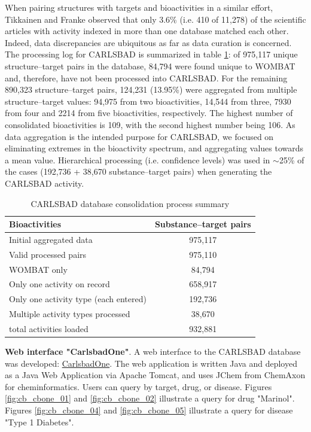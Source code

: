 When pairing structures with targets and bioactivities in a similar effort, Tikkainen and Franke observed that only 3.6\% (i.e. 410 of 11,278) of the scientific articles with activity indexed in more than one database matched each other. Indeed, data discrepancies are ubiquitous as far as data curation is concerned\cite{Tiikkainen2012-cw}. The processing log for CARLSBAD is summarized in table \ref{tab:cb_01}: of 975,117 unique structure–target pairs in the database, 84,794 were found unique to WOMBAT and, therefore, have not been processed into CARLSBAD. For the remaining 890,323 structure–target pairs, 124,231 (13.95\%) were aggregated from multiple structure–target values: 94,975 from two bioactivities, 14,544 from three, 7930 from four and 2214 from five bioactivities, respectively. The highest number of consolidated bioactivities is 109, with the second highest number being 106. As data aggregation is the intended purpose for CARLSBAD, we focused on eliminating extremes in the bioactivity spectrum, and aggregating values towards a mean value. Hierarchical processing (i.e. confidence levels) was used in $\sim$25\% of the cases (192,736 + 38,670 substance–target pairs) when generating the CARLSBAD activity.

\begin{table}
\caption{CARLSBAD database consolidation process summary}
\label{tab:cb_01}
\centering
\begin{tabular}{l|c}
\hline
\textbf{Bioactivities} & \textbf{Substance–target pairs} \\
\hline
Initial aggregated data & 975,117\\
Valid processed pairs & 975,110\\
WOMBAT only & 84,794\\
Only one activity on record & 658,917\\
Only one activity type (each entered) & 192,736\\ 
Multiple activity types processed & 38,670\\
total activities loaded & 932,881\\
\hline
\end{tabular}
\end{table}


\textbf{Web interface "CarlsbadOne"}. A web interface to the CARLSBAD database was developed:  \href{https://datascience.unm.edu/tomcat/carlsbad/carlsbadone}{CarlsbadOne}. The web application is written Java and deployed as a Java Web Application via Apache Tomcat, and uses JChem from ChemAxon for cheminformatics. Users can query by target, drug, or disease. Figures \ref{fig:cb_cbone_01} and \ref{fig:cb_cbone_02} illustrate a query for drug "Marinol". Figures \ref{fig:cb_cbone_04} and \ref{fig:cb_cbone_05} illustrate a query for disease "Type 1 Diabetes".

